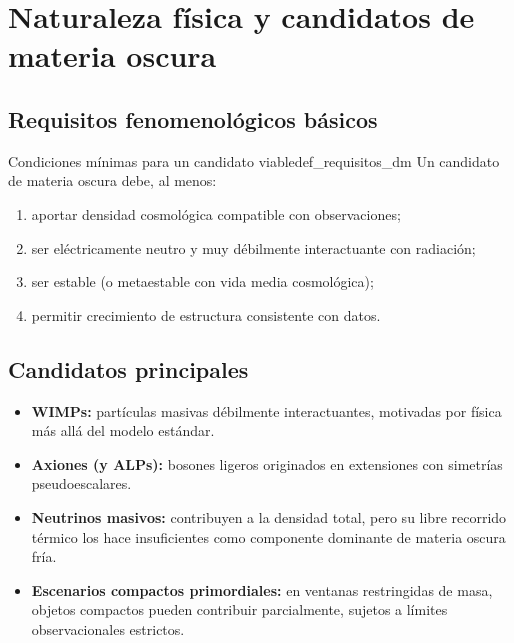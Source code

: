 \section{Naturaleza física y candidatos de materia oscura}
\label{sec:candidatos_dm}

\subsection{Requisitos fenomenológicos básicos}

\begin{definicion}{Condiciones mínimas para un candidato viable}{def_requisitos_dm}
Un candidato de materia oscura debe, al menos:
\begin{enumerate}[leftmargin=2em, label=\textbf{\arabic*.}]
  \item aportar densidad cosmológica compatible con observaciones;
  \item ser eléctricamente neutro y muy débilmente interactuante con radiación;
  \item ser estable (o metaestable con vida media cosmológica);
  \item permitir crecimiento de estructura consistente con datos.
\end{enumerate}
\end{definicion}

\subsection{Candidatos principales}

\begin{itemize}[leftmargin=2em]
  \item \textbf{WIMPs:} partículas masivas débilmente interactuantes, motivadas por física más allá del modelo estándar.
  \item \textbf{Axiones (y ALPs):} bosones ligeros originados en extensiones con simetrías pseudoescalares.
  \item \textbf{Neutrinos masivos:} contribuyen a la densidad total, pero su libre recorrido térmico los hace insuficientes como componente dominante de materia oscura fría.
  \item \textbf{Escenarios compactos primordiales:} en ventanas restringidas de masa, objetos compactos pueden contribuir parcialmente, sujetos a límites observacionales estrictos.
\end{itemize}

